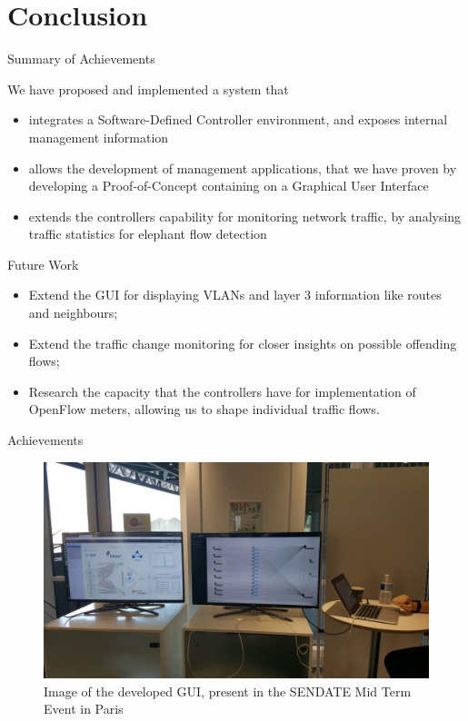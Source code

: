 \documentclass{beamer}
\begin{document}
\section{Conclusion}

\begin{frame}{Summary of Achievements}
    \item We have proposed and implemented a system that
    \begin{itemize}
        \item integrates a Software-Defined Controller environment, and exposes internal
            management information
            \pause
        \item allows the development of management applications, that we have proven 
            by developing a Proof-of-Concept containing on a Graphical User Interface
            \pause
        \item extends the controllers capability for monitoring network traffic, 
            by analysing traffic statistics for elephant flow detection
    \end{itemize}
\end{frame}

\begin{frame}{Future Work}
    \begin{itemize}
        \item Extend the GUI for displaying VLANs and layer 3 information like routes and neighbours;
        \item Extend the traffic change monitoring for closer insights on possible offending flows;
        \item Research the capacity that the controllers have for implementation of OpenFlow meters,
            allowing us to shape individual traffic flows.
    \end{itemize}
\end{frame}

\begin{frame}{Achievements}
    \begin{figure}
        \includegraphics[width=.9\textwidth]{presentation/basebox_paris}
        \caption{Image of the developed GUI, present in the SENDATE Mid Term Event in Paris}
    \end{figure}
\end{frame}

\printbibliography
\end{document}
